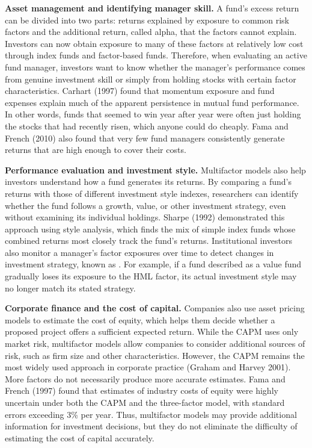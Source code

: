 \textbf{Asset management and identifying manager skill.}
A fund's excess return can be divided into two parts: returns
explained by exposure to common risk factors and the additional
return, called alpha, that the factors cannot explain. Investors
can now obtain exposure to many of these factors at relatively
low cost through index funds and factor-based funds. Therefore,
when evaluating an active fund manager, investors want to know
whether the manager's performance comes from genuine investment
skill or simply from holding stocks with certain factor
characteristics. Carhart (1997) found that momentum exposure and
fund expenses explain much of the apparent persistence in mutual
fund performance. In other words, funds that seemed to win year
after year were often just holding the stocks that had recently
risen, which anyone could do cheaply. Fama and French (2010) also found that very few
fund managers consistently generate returns that are high enough
to cover their costs.

\textbf{Performance evaluation and investment style.}
Multifactor models also help investors understand how a fund
generates its returns. By comparing a fund's returns with those
of different investment style indexes, researchers can identify
whether the fund follows a growth, value, or other investment
strategy, even without examining its individual holdings.
Sharpe (1992) demonstrated this approach using style analysis, which finds the mix of simple index funds whose combined returns most closely track the fund's returns.
Institutional investors also monitor a manager's factor exposures
over time to detect changes in investment strategy, known as
. For example, if a
fund described as a value fund gradually loses its exposure to
the HML factor, its actual investment style may no longer match
its stated strategy.

\textbf{Corporate finance and the cost of capital.}
Companies also use asset pricing models to estimate the cost of
equity, which helps them decide whether a proposed project offers
a sufficient expected return. While the CAPM uses only market
risk, multifactor models allow companies to consider additional
sources of risk, such as firm size and other characteristics.
However, the CAPM remains the most widely used approach in
corporate practice (Graham and Harvey 2001). More factors do not
necessarily produce more accurate estimates. Fama and French
(1997) found that estimates of industry costs of equity were
highly uncertain under both the CAPM and the three-factor model,
with standard errors exceeding 3\% per year. Thus, multifactor
models may provide additional information for investment
decisions, but they do not eliminate the difficulty of estimating
the cost of capital accurately.


